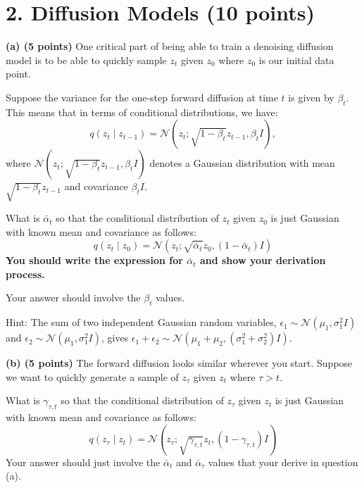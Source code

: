 \documentclass[12pt]{article}%
\begin{document}
\newpage


\section*{2. Diffusion Models (10 points)}

\textbf{(a) (5 points)} One critical part of being able to train a denoising diffusion model is to be able to quickly sample $z_t$ given $z_0$ where $z_0$ is our initial data point.


Suppose the variance for the one-step forward diffusion at time $t$ is given by $\beta_t$. This means that in terms of conditional distributions, we have:
\[
  q(z_t \mid z_{t-1}) = \mathcal{N}(z_t; \sqrt{1-\beta_t} z_{t-1}, \beta_t I),
\]
where $\mathcal{N}(z_t; \sqrt{1-\beta_t} z_{t-1}, \beta_t I)$ denotes a Gaussian distribution with mean $\sqrt{1-\beta_t} z_{t-1}$ and covariance $\beta_t I$.

What is $\bar{\alpha}_t$ so that the conditional distribution of $z_t$ given $z_0$ is just Gaussian with known mean and covariance as follows:
\[
  q(z_t \mid z_0) = \mathcal{N}(z_t; \sqrt{\bar{\alpha}_t}z_0, (1-\bar{\alpha}_t)I)
\]
\textbf{You should write the expression for $\bar{\alpha}_t$ and show your derivation process.}

Your answer should involve the $\beta_t$ values.

Hint: The sum of two independent Gaussian random variables, $\epsilon_1 \sim \mathcal{N}(\mu_1, \sigma^2_1I)$ and $\epsilon_2 \sim \mathcal{N}(\mu_1, \sigma^2_1I)$, gives $\epsilon_1 + \epsilon_2 \sim \mathcal{N}(\mu_1+\mu_2, (\sigma^2_1+\sigma^2_2)I)$.

\newpage

\textbf{(b) (5 points)} The forward diffusion looks similar wherever you start. Suppose we want to quickly generate a sample of $z_{\tau}$ given $z_t$ where $\tau > t$.


What is $\gamma_{\tau,t}$ so that the conditional distribution of $z_{\tau}$ given $z_t$ is just Gaussian with known mean and covariance as follows:
\[
  q(z_{\tau} \mid z_t) = \mathcal{N}(z_{\tau}; \sqrt{\gamma_{\tau,t}} z_t, (1-\gamma_{\tau,t})I)
\]
Your answer should just involve the $\bar{\alpha}_t$ and $\bar{\alpha}_{\tau}$ values that your derive in question (a).
\end{document}
